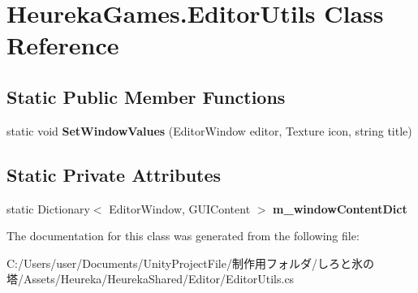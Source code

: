 \hypertarget{class_heureka_games_1_1_editor_utils}{}\section{Heureka\+Games.\+Editor\+Utils Class Reference}
\label{class_heureka_games_1_1_editor_utils}
\subsection*{Static Public Member Functions}
\begin{DoxyCompactItemize}
\item 
\mbox{\label{class_heureka_games_1_1_editor_utils_a189f01ab35ccf71af2260ab4ab58f4e3}} 
static void {\bfseries Set\+Window\+Values} (Editor\+Window editor, Texture icon, string title)
\end{DoxyCompactItemize}
\subsection*{Static Private Attributes}
\begin{DoxyCompactItemize}
\item 
\mbox{\label{class_heureka_games_1_1_editor_utils_a5e80f039aa1d06da8de89bb27feda36c}} 
static Dictionary$<$ Editor\+Window, G\+U\+I\+Content $>$ {\bfseries m\+\_\+window\+Content\+Dict}
\end{DoxyCompactItemize}


The documentation for this class was generated from the following file\+:\begin{DoxyCompactItemize}
\item 
C\+:/\+Users/user/\+Documents/\+Unity\+Project\+File/制作用フォルダ/しろと氷の塔/\+Assets/\+Heureka/\+Heureka\+Shared/\+Editor/Editor\+Utils.\+cs\end{DoxyCompactItemize}
